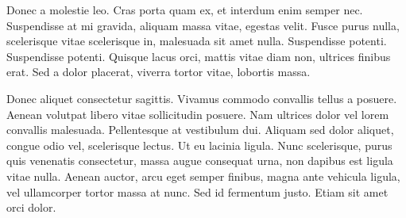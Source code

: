 Donec a molestie leo. Cras porta quam ex, et interdum enim semper nec. Suspendisse at mi gravida, aliquam massa vitae, egestas velit. Fusce purus nulla, scelerisque vitae scelerisque in, malesuada sit amet nulla. Suspendisse potenti. Suspendisse potenti. Quisque lacus orci, mattis vitae diam non, ultrices finibus erat. Sed a dolor placerat, viverra tortor vitae, lobortis massa.

Donec aliquet consectetur sagittis. Vivamus commodo convallis tellus a posuere. Aenean volutpat libero vitae sollicitudin posuere. Nam ultrices dolor vel lorem convallis malesuada. Pellentesque at vestibulum dui. Aliquam sed dolor aliquet, congue odio vel, scelerisque lectus. Ut eu lacinia ligula. Nunc scelerisque, purus quis venenatis consectetur, massa augue consequat urna, non dapibus est ligula vitae nulla. Aenean auctor, arcu eget semper finibus, magna ante vehicula ligula, vel ullamcorper tortor massa at nunc. Sed id fermentum justo. Etiam sit amet orci dolor.


